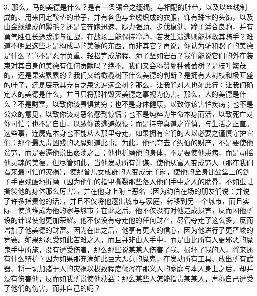 3. 那么，马的美德是什么？是有一条镶金之缰绳，与相配的肚带，以及以丝线制成的、用来固定鞍垫的带子，并有各色与金线织成的衣服，饰有珠宝的头饰，以及由金线编成的鬃毛？还是它奔跑迅速、腿力强劲、步伐稳健、蹄子适合良驹，并有勇气胜任长途跋涉与征战，在战场上能保持冷静，若发生溃逃则能拯救其骑手？难道不明显这些才是构成马的美德的东西，而非其它？再说，你认为驴和骡子的美德是什么？岂不是忍耐负重、轻松完成旅程、蹄子坚如岩石？我们能说它们的外在装束对其自身的美德有任何贡献吗？绝不。我们又会称赞哪种葡萄树？是枝叶繁茂的，还是果实累累的？我们又给橄榄树下什么美德的判断？是拥有大树枝和极旺盛的叶子，还是展示其专有之果实遍满全树？那么，让我们对人也如此行：让我们确定人的美德是什么，并且只将那种毁灭美德之事视为伤害。那么，人的美德是什么？不是财富，以致你该畏惧贫穷；也不是身体健康，以致你该害怕疾病；也不是公众的意见，以致你该对恶名感到惊慌；也不是纯粹为生命本身而活，以致死亡对你可怕；也不是自由，以致你该逃避奴役；而是持守真道之谨慎，与生活之正直。这些事，连魔鬼本身也不能从人那里夺走，如果拥有它们的人以必要之谨慎守护它们：那个最恶毒凶残的恶魔知道此事。为此，他也夺去了约伯的财产，不是要使他贫穷，而是要逼他说出亵渎之言；他也折磨他的身体，不是要使他患病，而是动摇他灵魂的美德。但尽管如此，当他发动所有计谋，使他从富人变成穷人（那在我们看来最可怕的灾祸），使那曾儿女成群的人变成无子嗣，使他的全身比公堂上的刽子手更残酷地折磨（因为他们的指甲撕裂那些落入他们手中之人的肋骨，不如虫蛀撕裂他的身体那么厉害），并在他身上附上恶名（因为约伯在场的朋友们说：并说了许多指责他的话），并且不仅将他逐出城市与家庭，转移到另一个城市，而且实际上使粪堆成为他的家与城市；在此之后，他不仅没有对他造成损害，反而因他所设的计谋使他更加荣耀。他不仅没有夺走他的任何财产，尽管夺走了这么多，反而增加了他美德的财富。因为在此之后，他享有更大的信心，因为他进行了更严峻的竞赛。如果那忍受如此苦难之人，而且并非由人手中，而是由比所有人更邪恶的魔鬼手中所施，没有遭受伤害，那么那些说某某人伤害了我、损坏了我的人，将来还有什么辩护？因为如果那充满如此巨大恶意的魔鬼，在发动所有工具、放出所有武器、将一切加诸于人的灾祸以极致程度倾泻在那义人的家庭与本人身上之后，却并没有伤害他，反而如我所说使他获益：那么某些人怎能指责某某人，声称自己遭受了他们的伤害，而非自己的呢？\par

